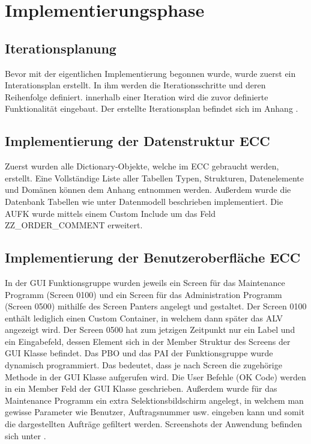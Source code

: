 \section{Implementierungsphase} 
\label{sec:Implementierungsphase}

\subsection{Iterationsplanung}
\label{sec:Iterationsplanung}
Bevor mit der eigentlichen Implementierung begonnen wurde, wurde zuerst ein Interationsplan erstellt. In ihm werden die Iterationsschritte und deren Reihenfolge definiert. innerhalb einer Iteration wird die zuvor definierte Funktionalität eingebaut. Der erstellte Iterationsplan befindet sich im Anhang .

\subsection{Implementierung der Datenstruktur ECC}
\label{sec:Implementierung der Datenstruktur ECC}
Zuerst wurden alle Dictionary-Objekte, welche im \ac{ECC} gebraucht werden, erstellt. Eine Vollständige Liste aller Tabellen Typen, Strukturen, Datenelemente und Domänen können dem Anhang entnommen werden. Außerdem wurde die Datenbank Tabellen wie unter Datenmodell beschrieben implementiert. Die AUFK wurde mittels einem Custom Include um das Feld ZZ\_ORDER\_COMMENT erweitert.

\subsection{Implementierung der Benutzeroberfläche ECC}
\label{sec:Implementierung der Benutzeroberfläche ECC}
In der \ac{GUI} Funktionsgruppe wurden jeweils ein Screen für das Maintenance Programm (Screen 0100) und ein Screen für das Administration Programm (Screen 0500) mithilfe des Screen Panters angelegt und gestaltet. Der Screen 0100 enthält lediglich einen Custom Container, in welchem dann später das \ac{ALV} angezeigt wird. Der Screen 0500 hat zum jetzigen Zeitpunkt nur ein Label und ein Eingabefeld, dessen Element sich in der Member Struktur des Screens der \ac{GUI} Klasse befindet. Das \ac{PBO} und das \ac{PAI} der Funktionsgruppe wurde dynamisch programmiert. Das bedeutet, dass je nach Screen die zugehörige Methode in der \ac{GUI} Klasse aufgerufen wird. Die User Befehle (OK Code) werden in ein Member Feld der \ac{GUI} Klasse geschrieben. Außerdem wurde für das Maintenance Programm ein extra Selektionsbildschirm angelegt, in welchem man gewisse Parameter wie Benutzer, Auftragsnummer usw. eingeben kann und somit die dargestellten Aufträge gefiltert werden. Screenshots der Anwendung befinden sich unter .

